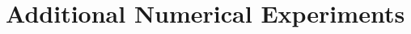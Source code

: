 \documentclass[twoside]{article}
\begin{document}
%
%







\section{Additional Numerical Experiments}\label{app:numericals}
\end{document}

